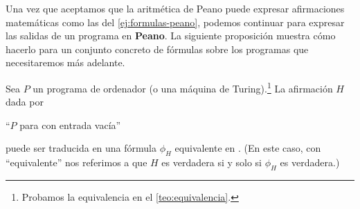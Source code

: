 \vspace*{8pt}

Una vez que aceptamos que la aritmética de Peano puede expresar afirmaciones matemáticas como las del \cref{ej:formulas-peano}, podemos continuar para expresar las salidas de un programa en \textbf{Peano}. La siguiente proposición muestra cómo hacerlo para un conjunto concreto de fórmulas sobre los programas que necesitaremos más adelante. \cite{MacCormick2018}

\begin{proposicion}\label{prop:parada-a-peano}
Sea $P$ un programa de ordenador (o una máquina de Turing).\footnote{Probamos la equivalencia en el \cref{teo:equivalencia}.} La afirmación $H$ dada por
\begin{adjustwidth}{30pt}{}
    ``$P$ para con entrada vacía''
\end{adjustwidth}
puede ser traducida en una fórmula $\phi_H$ equivalente en . (En este caso, con ``equivalente'' nos referimos a que $H$ es verdadera si y solo si $\phi_H$ es verdadera.)
\end{proposicion}
